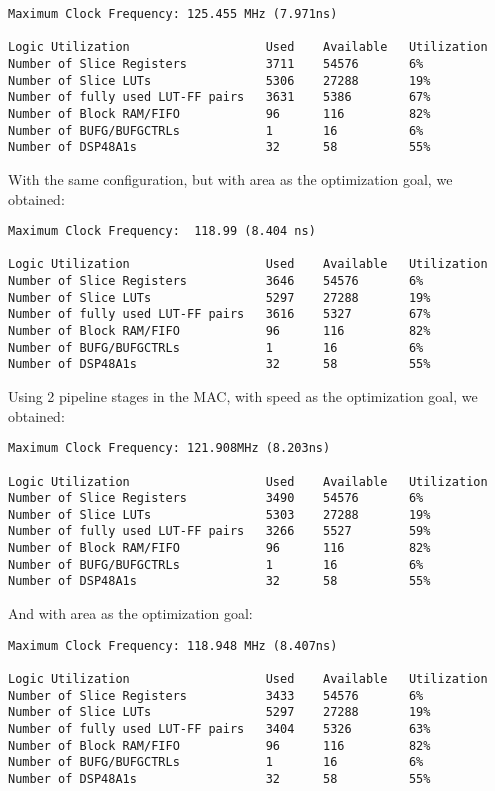 \documentclass[12pt]{article}
\begin{document}
\begin{verbatim}
Maximum Clock Frequency: 125.455 MHz (7.971ns)

Logic Utilization                   Used    Available   Utilization
Number of Slice Registers           3711    54576       6%
Number of Slice LUTs                5306    27288       19%
Number of fully used LUT-FF pairs   3631    5386        67%
Number of Block RAM/FIFO            96      116         82%
Number of BUFG/BUFGCTRLs            1       16          6%
Number of DSP48A1s                  32      58          55%
\end{verbatim}

With the same configuration, but with area as the optimization goal, we obtained:

\begin{verbatim}
Maximum Clock Frequency:  118.99 (8.404 ns)

Logic Utilization                   Used    Available   Utilization
Number of Slice Registers           3646    54576       6%
Number of Slice LUTs                5297    27288       19%
Number of fully used LUT-FF pairs   3616    5327        67%
Number of Block RAM/FIFO            96      116	        82%
Number of BUFG/BUFGCTRLs            1       16          6%
Number of DSP48A1s                  32      58          55%
\end{verbatim}

Using 2 pipeline stages in the MAC, with speed as the optimization goal, we obtained:
	
\begin{verbatim}
Maximum Clock Frequency: 121.908MHz (8.203ns)

Logic Utilization                   Used    Available   Utilization
Number of Slice Registers           3490    54576       6%
Number of Slice LUTs                5303    27288       19%
Number of fully used LUT-FF pairs   3266    5527        59%
Number of Block RAM/FIFO            96      116         82%
Number of BUFG/BUFGCTRLs            1       16          6%
Number of DSP48A1s                  32      58          55%
\end{verbatim}

And with area as the optimization goal:

\begin{verbatim}
Maximum Clock Frequency: 118.948 MHz (8.407ns)

Logic Utilization                   Used    Available   Utilization
Number of Slice Registers           3433    54576       6%
Number of Slice LUTs                5297    27288       19%
Number of fully used LUT-FF pairs   3404    5326        63%	
Number of Block RAM/FIFO            96      116         82%
Number of BUFG/BUFGCTRLs            1       16          6%
Number of DSP48A1s                  32      58          55%
\end{verbatim}
\end{document}
